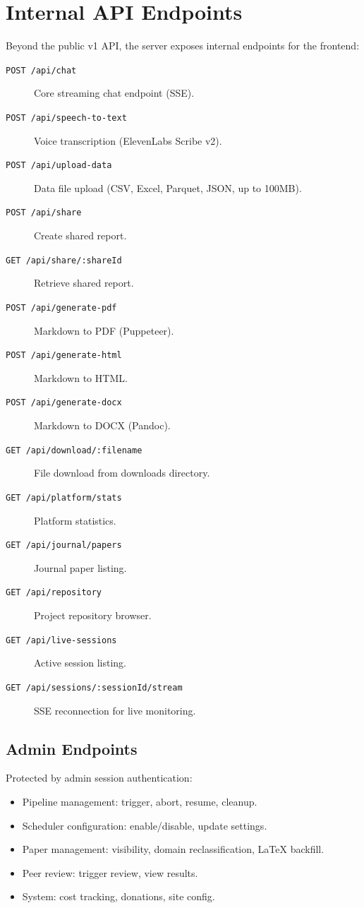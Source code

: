 \section{Internal API Endpoints}
\label{sec:api:internal}

Beyond the public v1 API, the server exposes internal endpoints for the frontend:

\begin{description}
  \item[\texttt{POST /api/chat}] Core streaming chat endpoint (SSE).
  \item[\texttt{POST /api/speech-to-text}] Voice transcription (ElevenLabs Scribe v2).
  \item[\texttt{POST /api/upload-data}] Data file upload (CSV, Excel, Parquet, JSON, up to 100MB).
  \item[\texttt{POST /api/share}] Create shared report.
  \item[\texttt{GET /api/share/:shareId}] Retrieve shared report.
  \item[\texttt{POST /api/generate-pdf}] Markdown to PDF (Puppeteer).
  \item[\texttt{POST /api/generate-html}] Markdown to HTML.
  \item[\texttt{POST /api/generate-docx}] Markdown to DOCX (Pandoc).
  \item[\texttt{GET /api/download/:filename}] File download from downloads directory.
  \item[\texttt{GET /api/platform/stats}] Platform statistics.
  \item[\texttt{GET /api/journal/papers}] Journal paper listing.
  \item[\texttt{GET /api/repository}] Project repository browser.
  \item[\texttt{GET /api/live-sessions}] Active session listing.
  \item[\texttt{GET /api/sessions/:sessionId/stream}] SSE reconnection for live monitoring.
\end{description}

\subsection{Admin Endpoints}

Protected by admin session authentication:

\begin{itemize}
  \item Pipeline management: trigger, abort, resume, cleanup.
  \item Scheduler configuration: enable/disable, update settings.
  \item Paper management: visibility, domain reclassification, \LaTeX{} backfill.
  \item Peer review: trigger review, view results.
  \item System: cost tracking, donations, site config.
\end{itemize}
